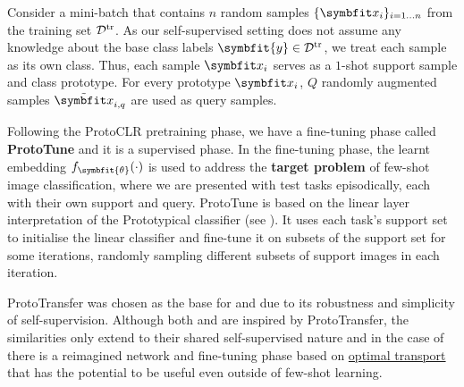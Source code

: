 \begin{tcolorbox}[title=Link between self-supervision and an episode]
Consider a mini-batch that contains $n$ random samples $\{{\bfitx_i}\}_{i=1 \ldots n}$ from the training set $\mathcal{D}^\textup{tr}$.
As our self-supervised setting does not assume any knowledge about the base class labels $\symbfit{y} \in \mathcal{D}^\textup{tr}$, we treat each sample as its own class. Thus, each sample $\bfitx_i$ serves as a $1$-shot support sample and class prototype. For every prototype $\bfitx_i$, $Q$ randomly augmented samples $\Tilde{\bfitx}_{i,q}$ are used as query samples.
\end{tcolorbox}

Following the ProtoCLR pretraining phase, we have a fine-tuning phase called \textbf{ProtoTune} and it is a supervised phase. In the fine-tuning phase, the learnt embedding $f_{\symbfit{\theta}}(\cdot)$ is used to address the \textbf{target problem} of few-shot image classification, where we are presented with test tasks episodically, each with their own support and query.
ProtoTune is based on the linear layer interpretation of the Prototypical classifier (see ). It uses each task's support set to initialise the linear classifier and fine-tune it on subsets of the support set for some iterations, randomly sampling different subsets of support images in each iteration.

ProtoTransfer was chosen as the base for \ccclr{} and \samptr{} due to its robustness and simplicity of self-supervision. Although both \ccclr{} and \samptr{} are inspired by ProtoTransfer, the similarities only extend to their shared self-supervised nature and in the case of \samptr{} there is a reimagined network and fine-tuning phase based on \hyperref[chap:optimal-transport]{optimal transport} that has the potential to be useful even outside of few-shot learning.